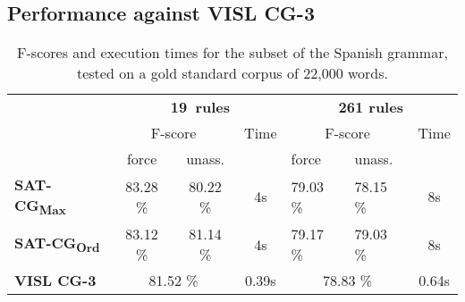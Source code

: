 


\def\satcgMax{SAT-CG\textsubscript{Max}}
\def\satcgOrd{SAT-CG\textsubscript{Ord}}

\subsection{Performance against VISL CG-3}


\begin{table}[h]
\centering
\begin{tabular}{l | c c c | p{1.1cm} p{1.1cm}  c}
 
           & \multicolumn{2}{r}{\textbf{19~rules}} & &  \multicolumn{3}{c}{\textbf{261 rules}} \\
                          & \multicolumn{2}{c}{F-score} 
                                               & Time   & \multicolumn{2}{c}{F-score} & Time \\
                          & force    & unass.      &  & force     & unass. &  \\ \hline

      \textbf{\satcgMax}  & 83.28 \% & 80.22 \%  & 4s  & 79.03 \% & 78.15 \% & 8s \\ 
      \textbf{\satcgOrd}  & 83.12 \% & 81.14 \%  & 4s  & 79.17 \% & 79.03 \% & 8s \\ 
      \textbf{VISL CG-3}  & \multicolumn{2}{c}{81.52 \%}  & 0.39s
                                             & \multicolumn{2}{c}{78.83 \%} & 0.64s\\ 
  \end{tabular}
\caption{F-scores and execution times for the subset of the Spanish grammar, tested on a gold standard corpus of 22,000 words.}
  \label{table:fscore}
\end{table}

